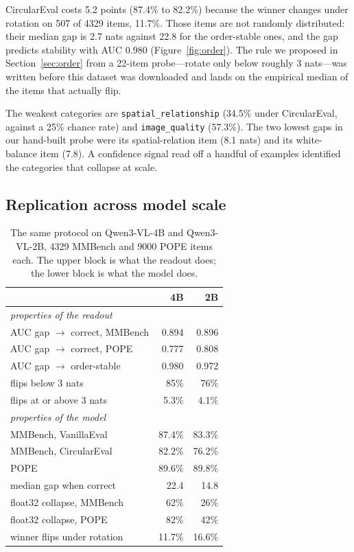 \documentclass[10pt,twocolumn]{article}
\begin{document}
CircularEval costs 5.2 points (87.4\% to 82.2\%) because the winner changes
under rotation on 507 of 4329 items, 11.7\%. Those items are not randomly
distributed: their median gap is 2.7 nats against 22.8 for the order-stable
ones, and the gap predicts stability with AUC 0.980 (Figure~\ref{fig:order}).
The rule we proposed in
Section~\ref{sec:order} from a 22-item probe---rotate only below roughly 3
nats---was written before this dataset was downloaded and lands on the
empirical median of the items that actually flip.

The weakest categories are \texttt{spatial\_relationship} (34.5\% under
CircularEval, against a 25\% chance rate) and \texttt{image\_quality}
(57.3\%). The two lowest gaps in our hand-built probe were its spatial-relation
item (8.1 nats) and its white-balance item (7.8). A confidence signal read off
a handful of examples identified the categories that collapse at scale.

\subsection{Replication across model scale}
\label{sec:replication}

\begin{table}[t]
\centering\small
\caption{The same protocol on Qwen3-VL-4B and Qwen3-VL-2B, 4329 MMBench and
9000 POPE items each. The upper block is what the readout does; the lower block
is what the model does.}
\label{tab:replication}
\begin{tabular}{lrr}
\toprule
 & 4B & 2B \\
\midrule
\multicolumn{3}{l}{\emph{properties of the readout}} \\
AUC gap $\rightarrow$ correct, MMBench & 0.894 & 0.896 \\
AUC gap $\rightarrow$ correct, POPE    & 0.777 & 0.808 \\
AUC gap $\rightarrow$ order-stable     & 0.980 & 0.972 \\
flips below 3 nats                     & 85\% & 76\% \\
flips at or above 3 nats               & 5.3\% & 4.1\% \\
\midrule
\multicolumn{3}{l}{\emph{properties of the model}} \\
MMBench, VanillaEval                   & 87.4\% & 83.3\% \\
MMBench, CircularEval                  & 82.2\% & 76.2\% \\
POPE                                   & 89.6\% & 89.8\% \\
median gap when correct                & 22.4 & 14.8 \\
float32 collapse, MMBench              & 62\% & 26\% \\
float32 collapse, POPE                 & 82\% & 42\% \\
winner flips under rotation            & 11.7\% & 16.6\% \\
\bottomrule
\end{tabular}
\end{table}
\end{document}
